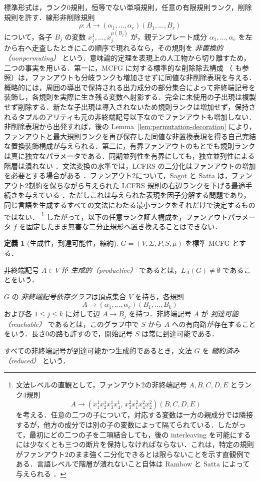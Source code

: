 \documentclass[11pt,a4paper]{ltjsarticle}
\numberwithin{equation}{section}
\theoremstyle{plain}
\theoremstyle{definition}
\newtheorem{definition}[theorem]{定義}
\theoremstyle{remark}
\begin{document}
標準形式は，ランク0規則，恒等でない単項規則，任意の有限規則ランク，削除規則を許す．線形非削除規則
\[
\rho:A\to(\alpha_1,\ldots,\alpha_e)(B_1,\ldots,B_r)
\]
について，各子 $B_j$ の変数 $x_j^1,\ldots,x_j^{\mu(B_j)}$ が，親テンプレート成分 $\alpha_1,\ldots,\alpha_e$ を左から右へ走査したときにこの順序で現れるなら，その規則を \emph{非置換的（nonpermuting）} という．意味論的定理を表現上の人工物から切り離すため，二つの事実を用いる．第一に，MCFG に対する標準的な削除除去構成
\cite[Lemma~2.2]{SekiEtAl1991}（\cite[Section~2]{Kanazawa2019Ogden} も参照）は，ファンアウトも分岐ランクも増加させずに同値な非削除表現を与える．概略的には，周囲の導出で保持される出力成分の部分集合によって非終端記号を装飾し，各規則を実際に生き残る変数へ射影する．完全に未使用の子出現は複製せず削除する．新たな子出現は導入されないため規則ランクは増加せず，保持されるタプルのアリティも元の非終端記号以下なのでファンアウトも増加しない．非削除表現から出発すれば，後の Lemma~\ref{lem:permutation-decoration} により，ファンアウトと最大規則ランクを再び保存した同値な非置換表現を得る自己完結な置換装飾構成が与えられる．第二に，有界ファンアウトのもとでも規則ランクは真に独立なパラメータである．同期並列性を有界にしても，独立並列性による階層は潰れない
\cite{RambowSatta1999}．文法変換の水準では，LCFRS の二分化はファンアウトの増加を必要とする場合がある
\cite{GomezRodriguezEtAl2009}．ファンアウト2について，Sagot と Satta は，ファンアウト2制約を保ちながら与えられた LCFRS 規則の右辺ランクを下げる最適手続きを与えている
\cite{SagotSatta2010}．ただしこれは与えられた表現を因子分解する問題であり，同じ言語を生成するすべての文法にわたる最小ランクをそれだけで決定するものではない．%
\footnote{文法レベルの直観として，ファンアウト2の非終端記号 $A,B,C,D,E$ とランク4規則
\[
A\to(x_1^1x_2^1x_3^1x_4^1,\,
 x_3^2x_1^2x_4^2x_2^2)(B,C,D,E)
\]
を考える．任意の二つの子について，対応する変数は一方の親成分では隣接するが，他方の成分では別の子の変数によって隔てられている．したがって，最初にどの二つの子を二項結合しても，後の interleaving を可能にするには少なくとも三つの断片を保持しなければならない．これは，特定の規則がファンアウト2のまま強く二分化できるとは限らないことを示す直観例である．言語レベルで階層が潰れないこと自体は Rambow と Satta によって与えられる \cite{RambowSatta1999}．}
したがって，以下の任意ランク証人構成を，ファンアウトパラメータ $f$ を固定したまま無害な二分正規形へ置き換えることはできない．

\begin{definition}[生成性，到達可能性，縮約]
\label{def:productive-reachable-reduced}
$G=(V,\Sigma,P,S,\mu)$ を標準 MCFG とする．

非終端記号 $A\in V$ が \emph{生成的（productive）} であるとは，$L_A(G)\ne\emptyset$ であることをいう．

$G$ の \emph{非終端記号依存グラフ}は頂点集合 $V$ を持ち，各規則
\[
A\to(\alpha_1,\ldots,\alpha_e)(B_1,\ldots,B_k)
\]
および各 $1\le j\le k$ に対して辺 $A\to B_j$ を持つ．非終端記号 $A$ が \emph{到達可能（reachable）} であるとは，このグラフ中で $S$ から $A$ への有向路が存在することをいう．長さ0の路も許すので，開始記号 $S$ は常に到達可能である．

すべての非終端記号が到達可能かつ生成的であるとき，文法 $G$ を \emph{縮約済み（reduced）} という．
\end{definition}
\end{document}
